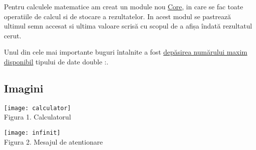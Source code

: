 Pentru calculele matematice am creat un module nou \href{https://github.com/AScripnic/MIDPS-laboratories/tree/master/Lab%232/Core/Core}{Core}, in care se fac toate operatiile de calcul si de stocare a rezultatelor.
In acest modul se pastrează ultimul semn accesat si ultima valoare scrisă cu scopul de a afișa îndată rezultatul cerut. \par

Unul din cele mai importante buguri întalnite a fost \href{https://github.com/AScripnic/MIDPS-laboratories/blob/master/Lab%232/Calculator/Calculator/Form1.cs#L74}{depăsirea numărului maxim disponibil} tipului de date double \cite{bugs}:.


\subsection{Imagini}
\begin{center}
	\texttt{[image: calculator]}\\
	Figura 1. Calculatorul

	\bigskip 
	\texttt{[image: infinit]}\\
	Figura 2. Mesajul de atentionare
\end{center}

\clearpage